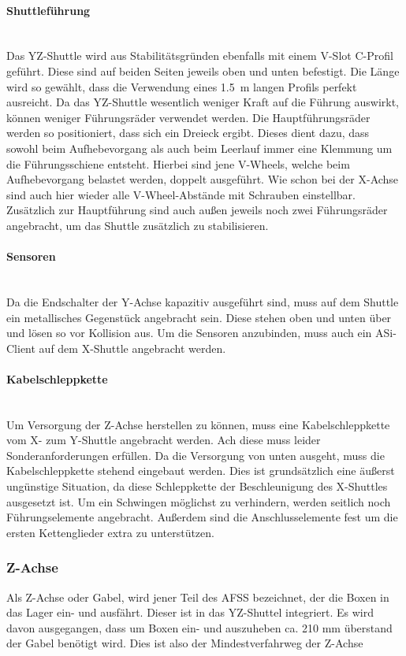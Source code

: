 \paragraph{Shuttleführung}\mbox{}\\
Das YZ-Shuttle wird aus Stabilitätsgründen ebenfalls mit einem V-Slot C-Profil geführt. Diese sind auf beiden Seiten jeweils oben und unten befestigt. Die Länge wird so gewählt, dass die Verwendung eines \SI{1.5}{\meter} langen Profils perfekt ausreicht. Da das YZ-Shuttle wesentlich weniger Kraft auf die Führung auswirkt, können weniger Führungsräder verwendet werden. Die Hauptführungsräder werden so positioniert, dass sich ein Dreieck ergibt. Dieses dient dazu, dass sowohl beim Aufhebevorgang als auch beim Leerlauf immer eine Klemmung um die Führungsschiene entsteht. Hierbei sind jene V-Wheels, welche beim Aufhebevorgang belastet werden, doppelt ausgeführt. Wie schon bei der X-Achse sind auch hier wieder alle V-Wheel-Abstände mit Schrauben einstellbar. Zusätzlich zur Hauptführung sind auch außen jeweils noch zwei Führungsräder angebracht, um das Shuttle zusätzlich zu stabilisieren.

\paragraph{Sensoren}\mbox{}\\
Da die Endschalter der Y-Achse kapazitiv ausgeführt sind, muss auf dem Shuttle ein metallisches Gegenstück angebracht sein. Diese stehen oben und unten über und lösen so vor Kollision aus. Um die Sensoren anzubinden, muss auch ein ASi-Client auf dem X-Shuttle angebracht werden.

\paragraph{Kabelschleppkette}\mbox{}\\
Um Versorgung der Z-Achse herstellen zu können, muss eine Kabelschleppkette vom X- zum Y-Shuttle angebracht werden. Ach diese muss leider Sonderanforderungen erfüllen. Da die Versorgung von unten ausgeht, muss die Kabelschleppkette stehend eingebaut werden. Dies ist grundsätzlich eine äußerst ungünstige Situation, da diese Schleppkette der Beschleunigung des X-Shuttles ausgesetzt ist. Um ein Schwingen möglichst zu verhindern, werden seitlich noch Führungselemente angebracht. Außerdem sind die Anschlusselemente fest um die ersten Kettenglieder extra zu unterstützen. \cite{igus_vertikal}

\subsubsection{Z-Achse}
Als Z-Achse oder Gabel, wird jener Teil des AFSS bezeichnet, der die Boxen in das Lager ein- und ausfährt. Dieser ist in das YZ-Shuttel integriert. Es wird davon ausgegangen, dass um Boxen ein- und auszuheben ca. 210 mm überstand der Gabel benötigt wird. Dies ist also der Mindestverfahrweg der Z-Achse

